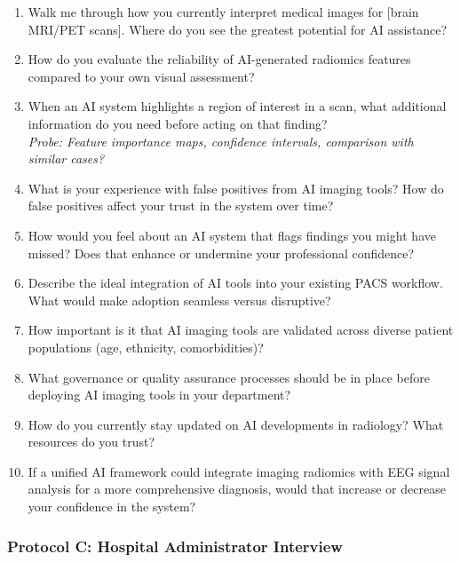 \begin{enumerate}[label=\textbf{RA\arabic*.}, leftmargin=2cm]
    \item Walk me through how you currently interpret medical images for [brain MRI/PET scans]. Where do you see the greatest potential for AI assistance?
    \item How do you evaluate the reliability of AI-generated radiomics features compared to your own visual assessment?
    \item When an AI system highlights a region of interest in a scan, what additional information do you need before acting on that finding? \\
    \textit{Probe: Feature importance maps, confidence intervals, comparison with similar cases?}
    \item What is your experience with false positives from AI imaging tools? How do false positives affect your trust in the system over time?
    \item How would you feel about an AI system that flags findings you might have missed? Does that enhance or undermine your professional confidence?
    \item Describe the ideal integration of AI tools into your existing PACS workflow. What would make adoption seamless versus disruptive?
    \item How important is it that AI imaging tools are validated across diverse patient populations (age, ethnicity, comorbidities)?
    \item What governance or quality assurance processes should be in place before deploying AI imaging tools in your department?
    \item How do you currently stay updated on AI developments in radiology? What resources do you trust?
    \item If a unified AI framework could integrate imaging radiomics with EEG signal analysis for a more comprehensive diagnosis, would that increase or decrease your confidence in the system?
\end{enumerate}

\subsubsection{Protocol C: Hospital Administrator Interview}

